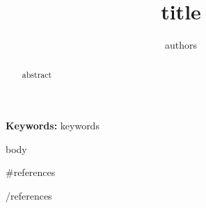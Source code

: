 \documentclass[12pt,a4paper]{article}
\title{ {{title}} }
\author{ {{authors}} }
\date{}
\begin{document}
\maketitle

\begin{abstract}
{{abstract}}
\end{abstract}

\textbf{Keywords:} {{keywords}}

{{body}}

{{#references}}


{{/references}}
\end{document}
